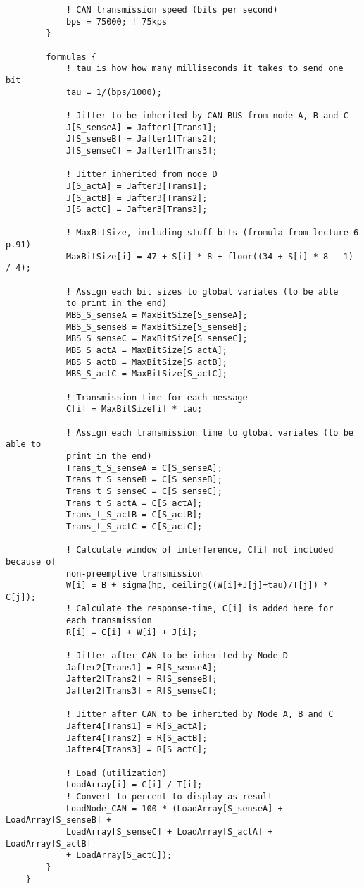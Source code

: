 \begin{lstlisting}
			! CAN transmission speed (bits per second)
			bps = 75000; ! 75kps
		}
	
		formulas {
			! tau is how how many milliseconds it takes to send one bit
			tau = 1/(bps/1000);
	
			! Jitter to be inherited by CAN-BUS from node A, B and C
			J[S_senseA] = Jafter1[Trans1];
			J[S_senseB] = Jafter1[Trans2];
			J[S_senseC] = Jafter1[Trans3];
	
			! Jitter inherited from node D
			J[S_actA] = Jafter3[Trans1];
			J[S_actB] = Jafter3[Trans2];
			J[S_actC] = Jafter3[Trans3];
	
			! MaxBitSize, including stuff-bits (fromula from lecture 6 p.91)
			MaxBitSize[i] = 47 + S[i] * 8 + floor((34 + S[i] * 8 - 1) / 4);
	
			! Assign each bit sizes to global variales (to be able 
			to print in the end)
			MBS_S_senseA = MaxBitSize[S_senseA];
			MBS_S_senseB = MaxBitSize[S_senseB];
			MBS_S_senseC = MaxBitSize[S_senseC];
			MBS_S_actA = MaxBitSize[S_actA];
			MBS_S_actB = MaxBitSize[S_actB];
			MBS_S_actC = MaxBitSize[S_actC];
	
			! Transmission time for each message
			C[i] = MaxBitSize[i] * tau;
	
			! Assign each transmission time to global variales (to be able to 
			print in the end)
			Trans_t_S_senseA = C[S_senseA];
			Trans_t_S_senseB = C[S_senseB];
			Trans_t_S_senseC = C[S_senseC];
			Trans_t_S_actA = C[S_actA];
			Trans_t_S_actB = C[S_actB];
			Trans_t_S_actC = C[S_actC];
	
			! Calculate window of interference, C[i] not included because of 
			non-preemptive transmission
			W[i] = B + sigma(hp, ceiling((W[i]+J[j]+tau)/T[j]) * C[j]);
			! Calculate the response-time, C[i] is added here for 
			each transmission
			R[i] = C[i] + W[i] + J[i];
	
			! Jitter after CAN to be inherited by Node D
			Jafter2[Trans1] = R[S_senseA];
			Jafter2[Trans2] = R[S_senseB];
			Jafter2[Trans3] = R[S_senseC];
	
			! Jitter after CAN to be inherited by Node A, B and C
			Jafter4[Trans1] = R[S_actA];
			Jafter4[Trans2] = R[S_actB];
			Jafter4[Trans3] = R[S_actC];
	
			! Load (utilization)
			LoadArray[i] = C[i] / T[i];
			! Convert to percent to display as result
			LoadNode_CAN = 100 * (LoadArray[S_senseA] + LoadArray[S_senseB] + 
			LoadArray[S_senseC] + LoadArray[S_actA] + LoadArray[S_actB] 
			+ LoadArray[S_actC]);
		}
	}
	

\end{lstlisting}
